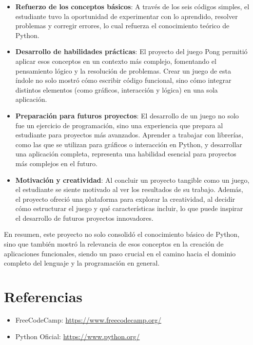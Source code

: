 \documentclass{article}
\begin{document}
\begin{itemize}
    \item \textbf{Refuerzo de los conceptos básicos}: A través de los seis códigos simples, el estudiante tuvo la oportunidad de experimentar con lo aprendido, resolver problemas y corregir errores, lo cual refuerza el conocimiento teórico de Python.
    
    \item \textbf{Desarrollo de habilidades prácticas}: El proyecto del juego Pong permitió aplicar esos conceptos en un contexto más complejo, fomentando el pensamiento lógico y la resolución de problemas. Crear un juego de esta índole no solo mostró cómo escribir código funcional, sino cómo integrar distintos elementos (como gráficos, interacción y lógica) en una sola aplicación.
    
    \item \textbf{Preparación para futuros proyectos}: El desarrollo de un juego no solo fue un ejercicio de programación, sino una experiencia que prepara al estudiante para proyectos más avanzados. Aprender a trabajar con librerías, como las que se utilizan para gráficos o interacción en Python, y desarrollar una aplicación completa, representa una habilidad esencial para proyectos más complejos en el futuro.
    
    \item \textbf{Motivación y creatividad}: Al concluir un proyecto tangible como un juego, el estudiante se siente motivado al ver los resultados de su trabajo. Además, el proyecto ofreció una plataforma para explorar la creatividad, al decidir cómo estructurar el juego y qué características incluir, lo que puede inspirar el desarrollo de futuros proyectos innovadores.
\end{itemize}

En resumen, este proyecto no solo consolidó el conocimiento básico de Python, sino que también mostró la relevancia de esos conceptos en la creación de aplicaciones funcionales, siendo un paso crucial en el camino hacia el dominio completo del lenguaje y la programación en general.

\section*{Referencias}

\begin{itemize}
    \item FreeCodeCamp: \url{https://www.freecodecamp.org/}
    \item Python Oficial: \url{https://www.python.org/}
\end{itemize}
\end{document}
